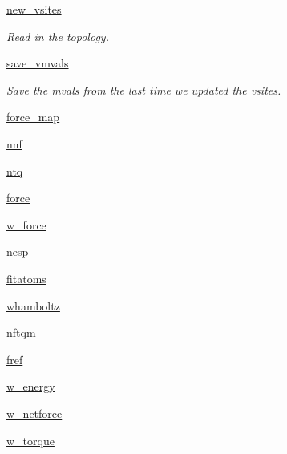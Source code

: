 \begin{DoxyCompactItemize}
\hyperlink{classforcebalance_1_1abinitio_1_1AbInitio_abab8d9c8cbf4eddc5a3c10b6240423e6}{new\-\_\-vsites}
\begin{DoxyCompactList}\small\item\em \-Read in the topology. \end{DoxyCompactList}\item 
\hyperlink{classforcebalance_1_1abinitio_1_1AbInitio_a430661954fff8c1979eb9ac28523bb5e}{save\-\_\-vmvals}
\begin{DoxyCompactList}\small\item\em \-Save the mvals from the last time we updated the vsites. \end{DoxyCompactList}\item 
\hyperlink{classforcebalance_1_1abinitio_1_1AbInitio_ab5b58642be0ba7651c16031f955189dc}{force\-\_\-map}
\item 
\hyperlink{classforcebalance_1_1abinitio_1_1AbInitio_aa4eadda3b8377b783dec2d327cb66fa6}{nnf}
\item 
\hyperlink{classforcebalance_1_1abinitio_1_1AbInitio_a88902db5981ca2088a7cf47f5f9aa83a}{ntq}
\item 
\hyperlink{classforcebalance_1_1abinitio_1_1AbInitio_a54baa14272a2312e0fe1b77a0554c0aa}{force}
\item 
\hyperlink{classforcebalance_1_1abinitio_1_1AbInitio_a2f68f2c95e481c03e05b03d55851107f}{w\-\_\-force}
\item 
\hyperlink{classforcebalance_1_1abinitio_1_1AbInitio_a15710ca46f6141a6e5b00a382aa56632}{nesp}
\item 
\hyperlink{classforcebalance_1_1abinitio_1_1AbInitio_a2fba4108ea80f3e1f44cf4c96cd6d530}{fitatoms}
\item 
\hyperlink{classforcebalance_1_1abinitio_1_1AbInitio_a8f3cbe570dfaf74f84f71817cd3fb008}{whamboltz}
\item 
\hyperlink{classforcebalance_1_1abinitio_1_1AbInitio_add8cbee2d95e5702d7a0d1538f26539a}{nftqm}
\item 
\hyperlink{classforcebalance_1_1abinitio_1_1AbInitio_a89697453350c3013d227c3037608d51f}{fref}
\item 
\hyperlink{classforcebalance_1_1abinitio_1_1AbInitio_ab8c3b9a3e74ced53cc5f4e6f3c6c06ef}{w\-\_\-energy}
\item 
\hyperlink{classforcebalance_1_1abinitio_1_1AbInitio_aa9fa8ad127d442e9b545088eb741b9eb}{w\-\_\-netforce}
\item 
\hyperlink{classforcebalance_1_1abinitio_1_1AbInitio_ab4468582c2c010bec490e65a34cdc40a}{w\-\_\-torque}
\item 

\end{DoxyCompactItemize}
